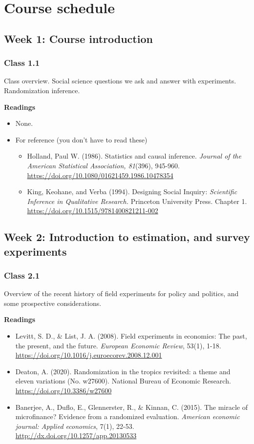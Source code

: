 \documentclass[letterpaper,12pt,parskip=full,DIV=10]{scrartcl}
\newcommand{\courseweek}[2]{\Needspace{12\baselineskip}\subsection*{Week #1: #2}}
\newcommand{\class}[2]{\Needspace{9\baselineskip}\subsubsection*{Class #1}\nopagebreak #2\par\nopagebreak\textbf{Readings}\par\nopagebreak}
\begin{document}
\section*{Course schedule}

\courseweek{1}{Course introduction}

\class{1.1}{Class overview. Social science questions we ask and answer with experiments. Randomization inference.}

\begin{itemize}

\item None.

\item For reference (you don't have to read these)

\begin{itemize}

\item Holland, Paul W. (1986). Statistics and causal inference. \emph{Journal of the American Statistical Association, 81}(396), 945-960. \url{https://doi.org/10.1080/01621459.1986.10478354}

\item King, Keohane, and Verba (1994). Designing Social Inquiry: \emph{Scientific Inference in Qualitative Research. }Princeton University Press. Chapter 1. \url{https://doi.org/10.1515/9781400821211-002}

\end{itemize}

\end{itemize}

\courseweek{2}{Introduction to estimation, and survey experiments}

\class{2.1}{Overview of the recent history of field experiments for policy and politics, and some prospective considerations.}

\begin{itemize}

\item Levitt, S. D., \& List, J. A. (2008). Field experiments in economics: The past, the present, and the future. \emph{European Economic Review}, 53(1), 1-18. \url{https://doi.org/10.1016/j.euroecorev.2008.12.001}

\item Deaton, A. (2020). Randomization in the tropics revisited: a theme and eleven variations (No. w27600). National Bureau of Economic Research.  \url{https://doi.org/10.3386/w27600}

\item Banerjee, A., Duflo, E., Glennerster, R., \& Kinnan, C. (2015). The miracle of microfinance? Evidence from a randomized evaluation. \emph{American economic journal: Applied economics}, 7(1), 22-53.  \url{http://dx.doi.org/10.1257/app.20130533}

\end{itemize}
\end{document}
